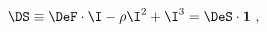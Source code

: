 \begin{equation}
  \label{eq:DS3}
  \DS\equiv\DeF\cdot\I-\rho\I^2+\I^3 = \DeS\cdot{\bf 1}\ ,
\end{equation}

